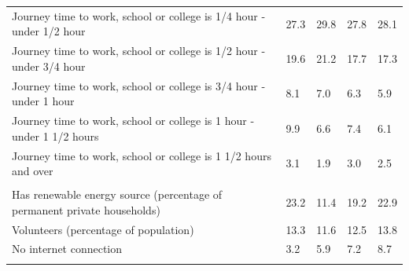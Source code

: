 \documentclass{article}
\begin{document}
\begin{table}[h]
\begin{tabular}{KTTTT}
Journey time to work, school or college is 1/4 hour - under 1/2 hour & 27.3& 29.8& 27.8& 28.1\\
Journey time to work, school or college is 1/2 hour - under 3/4 hour & 19.6& 21.2& 17.7& 17.3\\
Journey time to work, school or college is 3/4 hour - under 1 hour & 8.1& 7.0& 6.3& 5.9\\
Journey time to work, school or college is 1 hour - under 1 1/2 hours & 9.9& 6.6& 7.4& 6.1\\
Journey time to work, school or college is 1 1/2 hours and over & 3.1& 1.9& 3.0& 2.5\\
\hline
    \\ 
    \hline
Has renewable energy source (percentage of permanent private households) & 23.2& 11.4& 19.2& 22.9\\
    \hline
Volunteers (percentage of population) & 13.3& 11.6& 12.5& 13.8\\
    \hline
No internet connection& 3.2& 5.9& 7.2& 8.7\\
\hline
\end{tabular}
\end{table}
\end{document}
